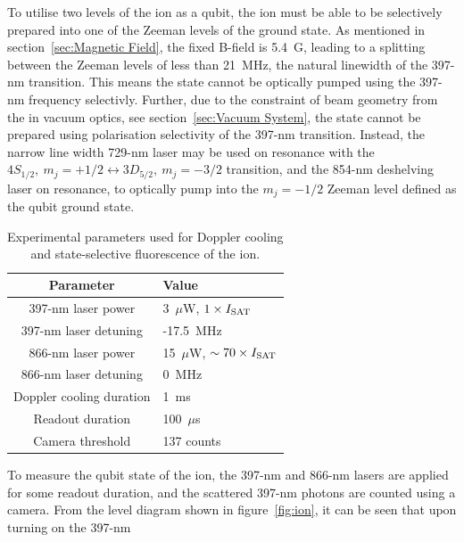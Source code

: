     To utilise two levels of the ion as a qubit, the ion must be able to be 
    selectively prepared into one of the Zeeman levels of the ground
    state. As mentioned in section~\ref{sec:Magnetic Field}, the fixed B-field is 5.4~G, leading to a splitting between the Zeeman
    levels of less than 21~MHz, the natural linewidth of the 397-nm transition.
    This means the state cannot be optically pumped using the 397-nm frequency selectivly.
    Further, due to the constraint of beam geometry from the in vacuum optics, see section~\ref{sec:Vacuum System},
    the state cannot be prepared using polarisation selectivity of the 397-nm transition. Instead,
    the narrow line width 729-nm laser may be used on resonance with the $4S_{1/2},~ m_j = +1/2 \leftrightarrow 3D_{5/2},~m_j = -3/2$ transition, and the 854-nm
    deshelving laser on resonance, to optically pump into the $m_j = -1/2$
    Zeeman level defined as the qubit ground state. \\
    \begin{table}
        \begin{center}
        \begin{tabular}{|c|l|}
            \hline
            Parameter & Value \\
            \hline
            397-nm laser power & 3~$\mu$W, $1\times I_{\rm SAT}$ \\
            397-nm laser detuning & -17.5~MHz\\
            866-nm laser power & 15~$\mu$W, $\sim 70\times I_{\rm SAT}$\\
            866-nm laser detuning & 0~MHz \\
            Doppler cooling duration & 1~ms\\
            Readout duration & 100~$\mu$s \\
            Camera threshold & 137 counts \\
            \hline
        \end{tabular}
        \end{center}
        \caption{
            Experimental parameters used for Doppler cooling and state-selective fluorescence of the ion. 
            }
        \label{tab:397_parameters}
    \end{table}
    To measure the qubit state of the ion, the 397-nm and 866-nm lasers
    are applied for some readout duration, and the scattered 397-nm photons are counted using a camera. From the level diagram shown in
    figure~\ref{fig:ion}, it can be seen that upon turning on the 397-nm
